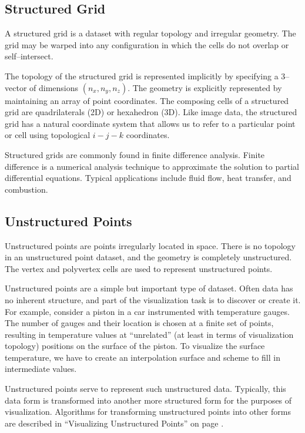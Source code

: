 \subsection{Structured Grid}

A structured grid is a dataset with regular topology and irregular geometry. The grid may be warped into any configuration in which the cells do not overlap or self--intersect.

The topology of the structured grid is represented implicitly by specifying a 3--vector of dimensions $(n_x, n_y, n_z)$. The geometry is explicitly represented by maintaining an array of point coordinates. The composing cells of a structured grid are quadrilaterals (2D) or hexahedron (3D). Like image data, the structured grid has a natural coordinate system that allows us to refer to a particular point or cell using topological $i-j-k$ coordinates.

Structured grids are commonly found in finite difference analysis. Finite difference is a numerical analysis technique to approximate the solution to partial differential equations. Typical applications include fluid flow, heat transfer, and combustion.

\subsection{Unstructured Points}

Unstructured points are points irregularly located in space. There is no topology in an unstructured point dataset, and the geometry is completely unstructured. The vertex and polyvertex cells are used to represent unstructured points.

Unstructured points are a simple but important type of dataset. Often data has no inherent structure, and part of the visualization task is to discover or create it. For example, consider a piston in a car instrumented with temperature gauges. The number of gauges and their location is chosen at a finite set of points, resulting in temperature values at ``unrelated'' (at least in terms of visualization topology) positions on the surface of the piston. To visualize the surface temperature, we have to create an interpolation surface and scheme to fill in intermediate values.

Unstructured points serve to represent such unstructured data. Typically, this data form is transformed into another more structured form for the purposes of visualization. Algorithms for transforming unstructured points into other forms are described in ``Visualizing Unstructured Points'' on page \pageref{subsec:visualizing_unstructured_points}.

